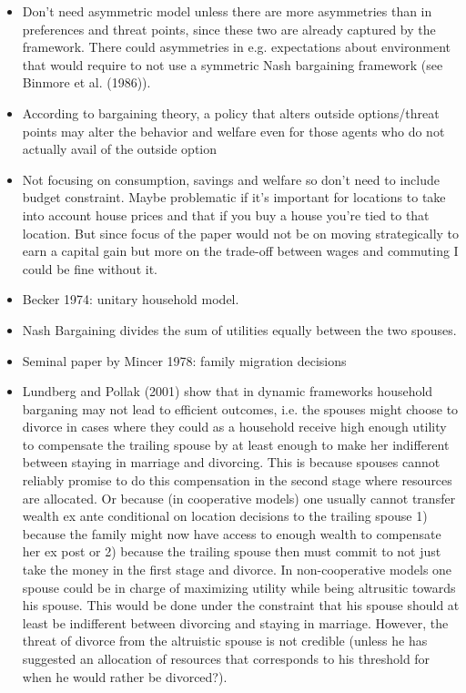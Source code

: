\begin{itemize}
\item Don't need asymmetric model unless there are more asymmetries than in preferences and threat points, since these two are already captured by the framework. There could asymmetries in e.g. expectations about environment that would require to not use a symmetric Nash bargaining framework (see Binmore et al. (1986)).
\item According to bargaining theory, a policy that alters outside options/threat points may alter the behavior and welfare even
for those agents who do not actually avail of the outside option
\item Not focusing on consumption, savings and welfare so don't need to include budget constraint. Maybe problematic if it's important for locations to take into account house prices and that if you buy a house you're tied to that location. But since focus of the paper would not be on moving strategically to earn a capital gain but more on the trade-off between wages and commuting I could be fine without it.
\item Becker 1974: unitary household model.
\item Nash Bargaining divides the sum of utilities equally between the two spouses.
\item Seminal paper by Mincer 1978: family migration decisions
\item Lundberg and Pollak (2001) show that in dynamic frameworks household barganing may not lead to efficient outcomes, i.e. the spouses might choose to divorce in cases where they could as a household receive high enough utility to compensate the trailing spouse by at least enough to make her indifferent between staying in marriage and divorcing. This is because spouses cannot reliably promise to do this compensation in the second stage where resources are allocated. Or because (in cooperative models) one usually cannot transfer wealth ex ante conditional on location decisions to the trailing spouse 1) because the family might now have access to enough wealth to compensate her ex post or 2) because the trailing spouse then must commit to not just take the money in the first stage and divorce. In non-cooperative models one spouse could be in charge of maximizing utility while being altrusitic towards his spouse. This would be done under the constraint that his spouse should at least be indifferent between divorcing and staying in marriage. However, the threat of divorce from the altruistic spouse is not credible (unless he has suggested an allocation of resources that corresponds to his threshold for when he would rather be divorced?).

\end{itemize}

